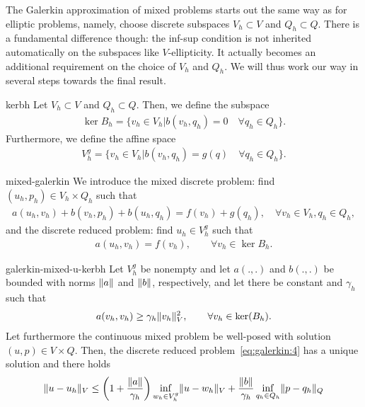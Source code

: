 \begin{intro}
  The Galerkin approximation of mixed problems starts out the same way
  as for elliptic problems, namely, choose discrete subspaces
  $V_h\subset V$ and $Q_h \subset Q$. There is a fundamental
  difference though: the inf-sup condition is not inherited
  automatically on the subspaces like $V$-ellipticity. It actually becomes
  an additional requirement on the choice of $V_h$ and
  $Q_h$. We will thus work our way in several steps towards the final
  result.
\end{intro}

\begin{Definition}{kerbh}
  Let $V_h\subset V$ and $Q_h\subset Q$. Then, we define the subspace
  \begin{gather}
    \label{eq:galerkin:1}
    \ker{B_h} = \bigl\{v_h\in V_h \big|
    b(v_h, q_h) = 0 \quad\forall q_h\in Q_h
    \bigr\}.
  \end{gather}
  Furthermore, we define the affine space
  \begin{gather}
    \label{eq:galerkin:2}
    V_h^g = \bigl\{v_h\in V_h \big|
    b(v_h, q_h) = g(q) \quad\forall q_h\in Q_h
    \bigr\}.
  \end{gather}
\end{Definition}


\begin{Definition}{mixed-galerkin}
  We introduce the mixed discrete problem: find $(u_h, p_h)\in
  V_h\times Q_h$ such that
  \begin{gather}
    \label{eq:galerkin:3}
    a(u_h, v_h) + b(v_h, p_h) + b(u_h, q_h) = f(v_h)+g(q_h),
    \quad\forall v_h\in V_h, q_h\in Q_h,
  \end{gather}
  and the discrete reduced problem: find $u_h\in V_h^g$ such that
  \begin{gather}
    \label{eq:galerkin:4}
    a(u_h, v_h) = f(v_h), \qquad\forall v_h \in \ker{B_h}.
  \end{gather}
\end{Definition}

\begin{Theorem}{galerkin-mixed-u-kerbh}
  Let $V_h^g$ be nonempty and let $a(.,.)$ and $b(.,.)$ be bounded
  with norms $\lVert a\rVert$ and $\lVert b\rVert$, respectively, and let there be constant and $\gamma_h$
  such that
  \begin{gather}
    \label{eq:galerkin:5}
    a(v_h, v_h) \ge \gamma_h \lVert v_h\rVert^2_V,
    \qquad\forall v_h\in \operatorname{ker}(B_h).
  \end{gather}
  Let furthermore the continuous mixed problem be well-posed with
  solution $(u,p)\in V\times Q$.
  Then, the discrete reduced problem~\eqref{eq:galerkin:4} has a
  unique solution and there holds
  \begin{gather}
    \label{eq:galerkin:8}
    \lVert u-u_h\rVert_V \le \left(1+\frac{\lVert a\rVert}{\gamma_h}\right)
    \inf_{w_h\in V_h^g}\lVert u-w_h\rVert_V
    + \frac{\lVert b\rVert}{\gamma_h}
    \inf_{q_h\in Q_h}\lVert p-q_h\rVert_Q
  \end{gather}
\end{Theorem}

